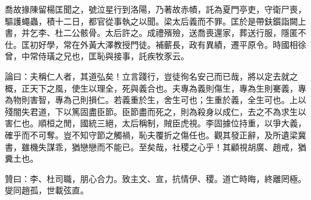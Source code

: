 \begin{pinyinscope}
喬故掾陳留楊匡聞之，號泣星行到洛陽，乃著故赤幘，託為夏門亭吏，守衛尸喪，驅護蠅蟲，積十二日，都官從事執之以聞。梁太后義而不罪。匡於是帶鈇鑕詣闕上書，并乞李、杜二公骸骨。太后許之。成禮殯殮，送喬喪還家，葬送行服，隱匿不仕。匡初好學，常在外黃大澤教授門徒。補蘄長，政有異績，遷平原令。時國相徐曾，中常侍璜之兄也，匡恥與接事，託疾牧豕云。

論曰：夫稱仁人者，其道弘矣！立言踐行，豈徒徇名安己而已哉，將以定去就之概，正天下之風，使生以理全，死與義合也。夫專為義則傷生，專為生則騫義，專為物則害智，專為己則損仁。若義重於生，舍生可也；生重於義，全生可也。上以殘闇失君道，下以篤固盡臣節。臣節盡而死之，則為殺身以成仁，去之不為求生以害仁也。順桓之閒，國統三絕，太后稱制，賊臣虎視。李固據位持重，以爭大義，確乎而不可奪。豈不知守節之觸禍，恥夫覆折之傷任也。觀其發正辭，及所遺梁冀書，雖機失謀乖，猶戀戀而不能已。至矣哉，社稷之心乎！其顧視胡廣、趙戒，猶糞土也。

贊曰：李、杜司職，朋心合力。致主文、宣，抗情伊、稷。道亡時晦，終離罔極。燮同趙孤，世載弦直。


\end{pinyinscope}